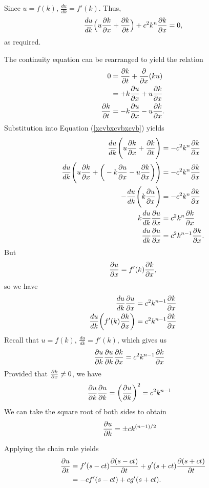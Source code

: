 Since $u=f(k)$, $\frac{du}{dk}=f'(k)$. Thus,
\begin{align*}
  \frac{du}{dk}\Big(u\kx+\kt\Big) + c^2k^n\frac{\partial k}{\partial x} =0,
\end{align*}
as required.
\item The continuity equation can be rearranged to yield the relation
\begin{align*}
  0&=\kt+\frac{\partial}{\partial x}(ku) \\
  &= +k\ux+u\kx \\
  \kt &= - k\ux-u\kx .
\end{align*}
Substitution into Equation (\ref{xcvbxcvbxcvb}) yields
\begin{align*}
  \frac{du}{dk} \Bigg(u\kx+\kt\Bigg)&=-c^2k^n\frac{\partial k}{\partial x} \\
  \frac{du}{dk} \Bigg(u\kx+\bigg( - k\ux-u\kx \bigg) \Bigg)&=-c^2k^n\frac{\partial k}{\partial x} \\  
  - \frac{du}{dk} \Bigg( k\ux  \Bigg)&=-c^2k^n\frac{\partial k}{\partial x} \\  
  k \frac{du}{dk} \ux &= c^2k^n\frac{\partial k}{\partial x} \\  
  \frac{du}{dk} \ux &= c^2k^{n-1}\frac{\partial k}{\partial x} .
\end{align*}
But 
\begin{align*}
   \ux =f'(k)\kx ,
\end{align*}
so we have
\begin{align*}
  \frac{du}{dk} \ux &= c^2k^{n-1}\kx \\  
  \frac{du}{dk}\bigg( f'(k)\kx \bigg) &= c^2k^{n-1}\frac{\partial k}{\partial x} \\  
\end{align*}
Recall that $u=f(k)$, $\frac{du}{dk}=f'(k)$, which gives us 
\begin{align*}
  \uk \uk \kx &= c^2k^{n-1}\kx 
\end{align*}
Provided that $\kx\ne0$, we have
\begin{align*}
  \uk \uk = \bigg(\uk\bigg)^2  &= c^2k^{n-1} 
\end{align*}
We can take the square root of both sides to obtain
\begin{align*}
  \uk &= \pm ck^{(n-1)/2} 
\end{align*}
\EEN
\item %
Applying the chain rule yields
\begin{align*}
  \ut &= f'(s-ct)\frac{\partial (s-ct)}{\partial t} + g'(s+ct)\frac{\partial (s+ct)}{\partial t} \\ &= -c f'(s-ct) + cg'(s+ct).
\end{align*}
